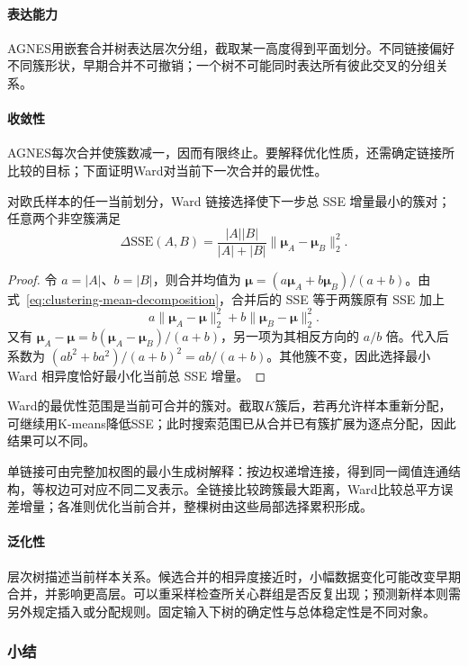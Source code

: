 \paragraph{表达能力}
AGNES用嵌套合并树表达层次分组，截取某一高度得到平面划分。不同链接偏好不同簇形状，早期合并不可撤销；一个树不可能同时表达所有彼此交叉的分组关系。

\paragraph{收敛性}
AGNES每次合并使簇数减一，因而有限终止。要解释优化性质，还需确定链接所比较的目标；下面证明Ward对当前下一次合并的最优性。

\begin{theorem}
 \label{thm:clustering-ward}
 对欧氏样本的任一当前划分，Ward 链接选择使下一步总 SSE 增量最小的簇对；任意两个非空簇满足
 \[
 \Delta\mathrm{SSE}(A,B)
 =\frac{|A||B|}{|A|+|B|}
   \lVert\bm{\mu}_A-\bm{\mu}_B\rVert_2^2.
 \]
\end{theorem}
\begin{proof}
令 $a=|A|$、$b=|B|$，则合并均值为 $\bm{\mu}=(a\bm{\mu}_A+b\bm{\mu}_B)/(a+b)$。由式~\eqref{eq:clustering-mean-decomposition}，合并后的 SSE 等于两簇原有 SSE 加上
\[
 a\lVert\bm{\mu}_A-\bm{\mu}\rVert_2^2+
 b\lVert\bm{\mu}_B-\bm{\mu}\rVert_2^2.
\]
又有 $\bm{\mu}_A-\bm{\mu}=b(\bm{\mu}_A-\bm{\mu}_B)/(a+b)$，另一项为其相反方向的 $a/b$ 倍。代入后系数为 $(ab^2+ba^2)/(a+b)^2=ab/(a+b)$。其他簇不变，因此选择最小 Ward 相异度恰好最小化当前总 SSE 增量。
\end{proof}

Ward的最优性范围是当前可合并的簇对。截取$K$簇后，若再允许样本重新分配，可继续用K-means降低SSE；此时搜索范围已从合并已有簇扩展为逐点分配，因此结果可以不同。

单链接可由完整加权图的最小生成树解释：按边权递增连接，得到同一阈值连通结构，等权边可对应不同二叉表示。全链接比较跨簇最大距离，Ward比较总平方误差增量；各准则优化当前合并，整棵树由这些局部选择累积形成。

\paragraph{泛化性}
层次树描述当前样本关系。候选合并的相异度接近时，小幅数据变化可能改变早期合并，并影响更高层。可以重采样检查所关心群组是否反复出现；预测新样本则需另外规定插入或分配规则。固定输入下树的确定性与总体稳定性是不同对象。

\subsubsection{小结}

